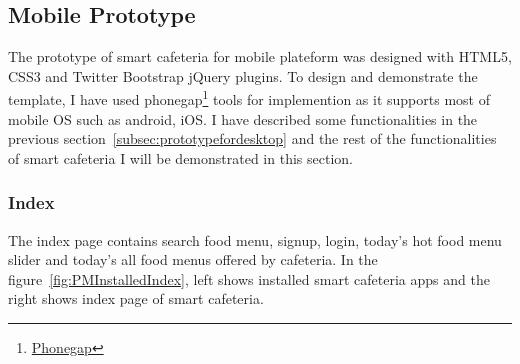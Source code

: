 \newpage
\subsection{Mobile Prototype}
\label{subsec:PrototypeforMobile}
The prototype of smart cafeteria for mobile plateform was designed with HTML5,
CSS3 and Twitter Bootstrap jQuery plugins. To design and demonstrate the
template, I have used phonegap\footnote{\href{http://phonegap.com/}{Phonegap}}
tools for implemention as it supports most of mobile OS such as android, iOS.
I have described some functionalities in the previous
section~\ref{subsec:prototypefordesktop} and the rest of the functionalities of
smart cafeteria I will be demonstrated in this section.

\subsubsection{Index}
\label{Indexpagemobile}
The index page contains search food menu, signup, login, today's hot food menu
slider and today's all food menus offered by cafeteria. In the
figure~\ref{fig:PMInstalledIndex}, left shows installed smart cafeteria apps and
the right shows index page of smart cafeteria.

